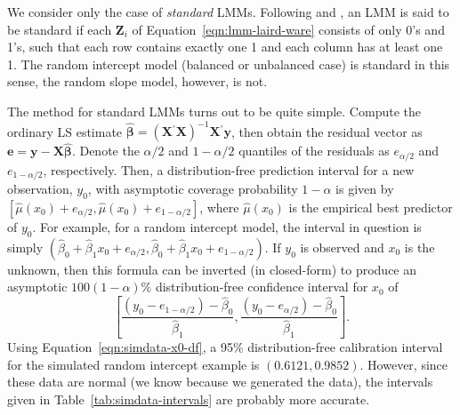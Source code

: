 \documentclass[cmfont,usenames,dvipsnames,leqno]{afit-etd}\usepackage[]{graphicx}\usepackage[]{color}
\newcommand{\trans}{\ensuremath{^\prime}}
\newcommand{\wh}[1]{\ensuremath{\widehat{#1}}}
\newcommand{\X}{\ensuremath{\bm{X}}}
\newcommand{\Z}{\ensuremath{\bm{Z}}}
\begin{document}
We consider only the case of \textit{standard} LMMs. Following \citet{jiang_distribution_2002} and \citet{jiang_linear_2007}, an LMM is said to be standard if each $\Z_i$ of Equation~\eqref{eqn:lmm-laird-ware} consists of only 0's and 1's, such that each row contains exactly one 1 and each column has at least one 1. The random intercept model (balanced or unbalanced case) is standard in this sense, the random slope model, however, is not. 

The method for standard LMMs turns out to be quite simple. Compute the ordinary LS estimate $\wh{\bm{\beta}} = \left(\X\trans\X\right)^{-1}\X\trans\bm{y}$, then obtain the residual vector as $\bm{e} = \bm{y} - \X\wh{\bm{\beta}}$. Denote the $\alpha/2$ and $1-\alpha/2$ quantiles of the residuals as $e_{\alpha/2}$ and $e_{1-\alpha/2}$, respectively. Then, a distribution-free prediction interval for a new observation, $y_0$, with asymptotic coverage probability $1-\alpha$ is given by
$\left[\wh{\mu}(x_0) + e_{\alpha/2}, \wh{\mu}(x_0) + e_{1-\alpha/2}\right]$, where $\wh{\mu}(x_0)$ is the empirical best predictor of $y_0$. For example, for a random intercept model, the interval in question is simply $\left(\wh{\beta}_0 + \wh{\beta}_1 x_0 + e_{\alpha/2}, \wh{\beta}_0 + \wh{\beta}_1 x_0 + e_{1-\alpha/2}\right)$. If $y_0$ is observed and $x_0$ is the unknown, then this formula can be inverted (in closed-form) to produce an asymptotic $100(1-\alpha)\%$ distribution-free confidence interval for $x_0$ of
\begin{equation} 
\label{eqn:simdata-x0-df}
  \left[ \frac{\left(y_0 - e_{1-\alpha/2}\right) - \wh{\beta}_0}{\wh{\beta}_1}, \frac{\left(y_0 - e_{\alpha/2}\right) - \wh{\beta}_0}{\wh{\beta}_1} \right].
\end{equation}
Using Equation~\eqref{eqn:simdata-x0-df}, a 95\% distribution-free calibration interval for the simulated random intercept example is $(0.6121, 0.9852)$. However, since these data are normal (we know because we generated the data), the intervals given in Table~\ref{tab:simdata-intervals} are probably more accurate. 
\end{document}
